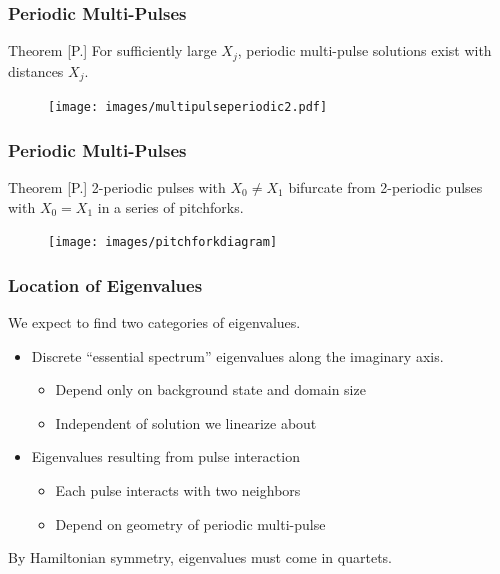 \documentclass[16pt]{beamer}
\begin{document}
\begin{frame}
\frametitle{Periodic Multi-Pulses} 
	\fontsize{16}{7.2}\selectfont
    \begin{block}{Theorem [P.]}
    For sufficiently large $X_j$, periodic multi-pulse solutions exist with distances $X_j$.

	\begin{figure}
	\begin{center}
	\texttt{[image: images/multipulseperiodic2.pdf]}
	\end{center}
	\end{figure}
    \end{block}
\end{frame}

\begin{frame}
\frametitle{Periodic Multi-Pulses} 
	\fontsize{16}{7.2}\selectfont
    \begin{block}{Theorem [P.]}
    2-periodic pulses with $X_0 \neq X_1$ bifurcate from 2-periodic pulses with $X_0 = X_1$ in a series of pitchforks.

	\begin{figure}
	\begin{center}
	\texttt{[image: images/pitchforkdiagram]}
	\end{center}
	\end{figure}
    \end{block}
\end{frame}

\begin{frame}
	\frametitle{Location of Eigenvalues}
	\fontsize{16}{7.2}\selectfont
	We expect to find two categories of eigenvalues.

	\begin{itemize}
		\item Discrete ``essential spectrum'' eigenvalues along the imaginary axis.
		\begin{itemize}
			\item Depend only on background state and domain size
			\item Independent of solution we linearize about
		\end{itemize}
		\item Eigenvalues resulting from pulse interaction 
		\begin{itemize}
			\item Each pulse interacts with two neighbors
			\item Depend on geometry of periodic multi-pulse
		\end{itemize}
	\end{itemize}
	\vspace{0.5cm}

	By Hamiltonian symmetry, eigenvalues must come in quartets.
\end{frame}
\end{document}
